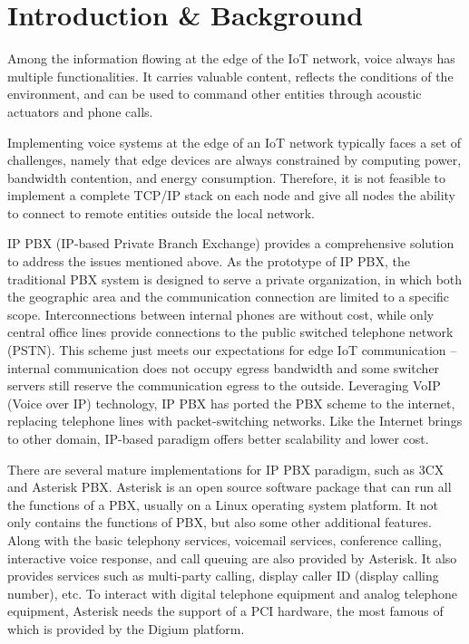 \section{Introduction \& Background}	\label{sec:introduction-background}

Among the information flowing at the edge of the IoT network, voice always has multiple functionalities. It carries valuable content, reflects the conditions of the environment, and can be used to command other entities through acoustic actuators and phone calls.

Implementing voice systems at the edge of an IoT network typically faces a set of challenges, namely that edge devices are always constrained by computing power, bandwidth contention, and energy consumption. Therefore, it is not feasible to implement a complete TCP/IP stack on each node and give all nodes the ability to connect to remote entities outside the local network.

IP PBX (IP-based Private Branch Exchange) provides a comprehensive solution to address the issues mentioned above. As the prototype of IP PBX, the traditional PBX system is designed to serve a private organization, in which both the geographic area and the communication connection are limited to a specific scope. Interconnections between internal phones are without cost, while only central office lines provide connections to the public switched telephone network (PSTN). This scheme just meets our expectations for edge IoT communication -- internal communication does not occupy egress bandwidth and some switcher servers still reserve the communication egress to the outside. Leveraging VoIP (Voice over IP) technology, IP PBX has ported the PBX scheme to the internet, replacing telephone lines with packet-switching networks. Like the Internet brings to other domain, IP-based paradigm offers better scalability and lower cost. 

There are several mature implementations for IP PBX paradigm, such as 3CX and Asterisk PBX. Asterisk is an open source software package that can run all the functions of a PBX, usually on a Linux operating system platform. It not only contains the functions of PBX, but also some other additional features. Along with the basic telephony services, voicemail services, conference calling, interactive voice response, and call queuing are also provided by Asterisk. It also provides services such as multi-party calling, display caller ID (display calling number), etc. To interact with digital telephone equipment and analog telephone equipment, Asterisk needs the support of a PCI hardware, the most famous of which is provided by the Digium platform. 

